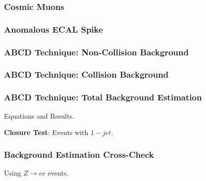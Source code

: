 \documentclass{beamer}
\begin{document}
\begin{frame}
\frametitle{Cosmic Muons}
 \begin{minipage}[t]{0.8\linewidth}
 

 \end{minipage}
\end{frame}

\begin{frame}
\frametitle{Anomalous ECAL Spike}
 \begin{minipage}[t]{0.8\linewidth}

 \end{minipage}
\end{frame}

\begin{frame}
\frametitle{ABCD Technique: Non-Collision Background}
\end{frame}

\begin{frame}
\frametitle{ABCD Technique: Collision Background}
\end{frame}

\begin{frame}
\frametitle{ABCD Technique: Total Background Estimation}
  Equations and Results.
 \begin{minipage}[t]{0.8\linewidth}

 \end{minipage}
 
 \textbf{Closure Test}: Events with $1-jet$.
 \begin{minipage}[t]{0.8\linewidth}

 \end{minipage}
\end{frame}

\begin{frame}
\frametitle{Background Estimation Cross-Check}
Using $Z \rightarrow ee$ events.
\end{frame}





\end{document}
